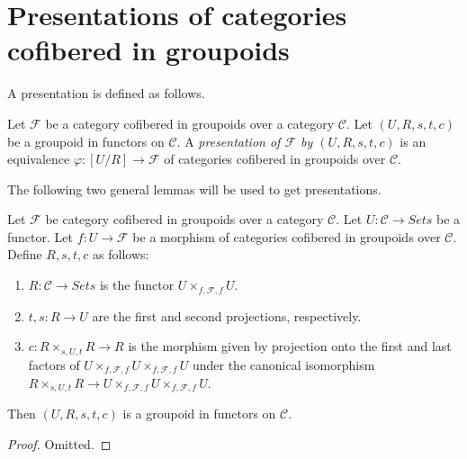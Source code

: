 \section{Presentations of categories cofibered in groupoids}
\label{section-presentation-categories-cofibred-in-groupoids}

\noindent
A presentation is defined as follows.

\begin{definition}
\label{definition-presentation}
Let $\mathcal{F}$ be a category cofibered in groupoids over a category
$\mathcal{C}$. Let $(U, R, s, t, c)$ be a groupoid in functors on
$\mathcal{C}$. A
{\it presentation of $\mathcal{F}$ by $(U, R, s, t, c)$} is an equivalence
$\varphi : [U/R] \to \mathcal{F}$ of categories cofibered in groupoids
over $\mathcal{C}$.
\end{definition}

\noindent
The following two general lemmas will be used to get presentations.

\begin{lemma}
\label{lemma-presentation-construction}
Let $\mathcal{F}$ be category cofibered in groupoids over a category
$\mathcal{C}$. Let $U : \mathcal{C} \to \textit{Sets}$ be a functor.
Let $f : U \to \mathcal{F}$ be a morphism of categories cofibered in groupoids
over $\mathcal{C}$. Define $R, s, t, c$ as follows:
\begin{enumerate}
\item $R : \mathcal{C} \to \textit{Sets}$ is the functor
$U \times_{f, \mathcal{F}, f} U$.
\item $t, s : R \to U$ are the first and second projections,
respectively.
\item $c : R \times_{s, U, t} R \to R$ is the morphism given by projection
onto the first and last factors of
$U \times_{f, \mathcal{F}, f} U \times_{f, \mathcal{F}, f} U$
under the canonical isomorphism
$R \times_{s, U, t} R \to
U \times_{f, \mathcal{F}, f} U \times_{f, \mathcal{F}, f} U$.
\end{enumerate}
Then $(U, R, s, t, c)$ is a groupoid in functors on $\mathcal{C}$.
\end{lemma}

\begin{proof}
Omitted.
\end{proof}

